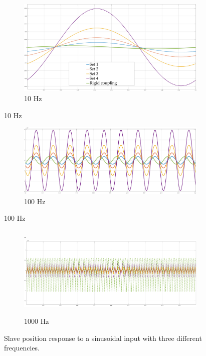 \begin{figure}[H]
	\begin{subfigure}[h!]{1\linewidth}
		\centering
		\includegraphics[width=\textwidth, height=0.29\textwidth]{Images/vibr10Htz}
		\caption{10 Hz}
		\label{fig:10Htz}
	\end{subfigure}
\end{figure}
\begin{figure}\ContinuedFloat
	\begin{subfigure}[h!]{1\linewidth}
		\centering
		\includegraphics[width=\textwidth, height=0.29\textwidth]{Images/vibr100Htz}
		\caption{100 Hz}
		\label{fig:100Htz}
	\end{subfigure}
\end{figure}
\begin{figure}\ContinuedFloat
	\begin{subfigure}[h!]{1\linewidth}
		\centering.
		\includegraphics[width=\textwidth, height=0.29\textwidth]{Images/vibr1000Htz}
		\caption{1000 Hz}
		\label{fig:1000Htz}
	\end{subfigure}
\caption{Slave position response to a sinusoidal input with three different frequencies.}
\label{positionResponceFrequencies}
\end{figure}

\newpage

